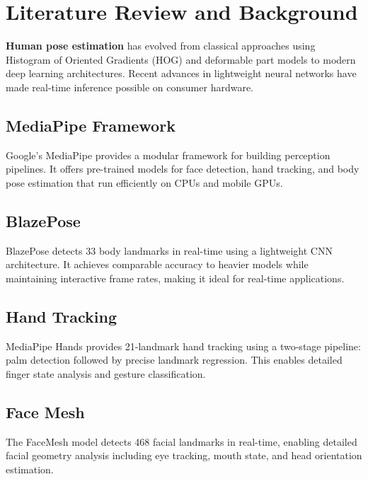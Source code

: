 \documentclass[a4paper,12pt]{report}
\begin{document}
\newpage

\chapter{Literature Review and Background}
\thispagestyle{contentpages}
\justifying

\textbf{Human pose estimation} has evolved from classical approaches using Histogram of Oriented Gradients (HOG) and deformable part models to modern deep learning architectures. Recent advances in lightweight neural networks have made real-time inference possible on consumer hardware.

\section{MediaPipe Framework}
Google's MediaPipe \cite{mediapipe2019} provides a modular framework for building perception pipelines. It offers pre-trained models for face detection, hand tracking, and body pose estimation that run efficiently on CPUs and mobile GPUs.

\section{BlazePose}
BlazePose \cite{blazepose2020} detects 33 body landmarks in real-time using a lightweight CNN architecture. It achieves comparable accuracy to heavier models while maintaining interactive frame rates, making it ideal for real-time applications.

\section{Hand Tracking}
MediaPipe Hands \cite{handtracking2020} provides 21-landmark hand tracking using a two-stage pipeline: palm detection followed by precise landmark regression. This enables detailed finger state analysis and gesture classification.

\section{Face Mesh}
The FaceMesh model \cite{facemesh2019} detects 468 facial landmarks in real-time, enabling detailed facial geometry analysis including eye tracking, mouth state, and head orientation estimation.
\end{document}
